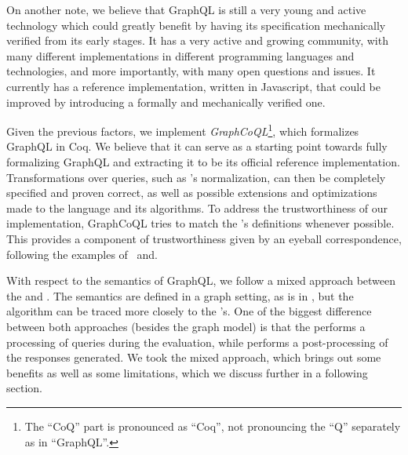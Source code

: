 
On another note, we believe that GraphQL is still a very young and active technology which could greatly benefit by having its specification mechanically verified from its early stages. It has a very active and growing community, with many different implementations in different programming languages and technologies, and more importantly, with many open questions and issues. It currently has a reference implementation, written in Javascript, that could be improved by introducing a formally and mechanically verified one. %

 Given the previous factors, we implement \textit{GraphCoQL}\footnote{The ``CoQ'' part is pronounced as ``Coq'', not pronouncing the ``Q'' separately as in ``GraphQL''.}, which formalizes GraphQL in Coq. We believe that it can serve as a starting point towards fully formalizing GraphQL and extracting it to be its official reference implementation.  Transformations over queries, such as \HP{}'s normalization, can then be completely specified and proven correct, as well as possible extensions and optimizations made to the language and its algorithms. To address the trustworthiness of our implementation, GraphCoQL tries to match the \spec{}'s definitions whenever possible. This provides a component of trustworthiness given by an eyeball correspondence, following the examples of~\cite{jscert} and\cite{coqr}.


With respect to the semantics of GraphQL, we follow a mixed approach between the \spec{} and \HP{}. The semantics are defined in a graph setting, as is in \HP{}, but the algorithm can be traced more closely to the \spec{}'s. One of the biggest difference between both approaches (besides the graph model) is that the \spec{} performs a processing of queries during the evaluation, while \HP{} performs a post-processing of the responses generated. We took the mixed approach, which brings out some benefits as well as some limitations, which we discuss further in a following section.

